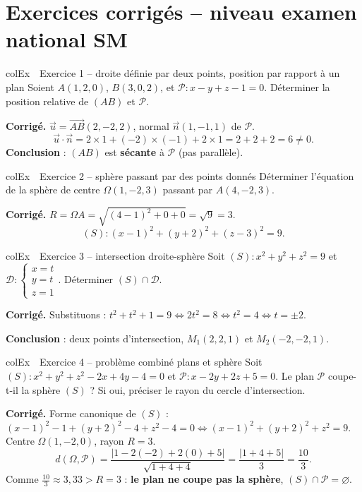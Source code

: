 \documentclass[11pt,a4paper]{article}
\newenvironment{exemple}[1][Exemple]
  {\begin{fiche}{colEx}{\ding{217}~~#1}}{\end{fiche}}
\begin{document}
\section{Exercices corrigés -- niveau examen national SM}

\begin{exemple}[Exercice 1 -- droite définie par deux points, position par rapport à un plan]
Soient $A(1,2,0)$, $B(3,0,2)$, et $\mathcal{P}:x-y+z-1=0$. Déterminer la position relative de $(AB)$ et $\mathcal{P}$.

\smallskip
\textbf{Corrigé.} $\vec u=\overrightarrow{AB}(2,-2,2)$, normal $\vec n(1,-1,1)$ de $\mathcal{P}$.
\[
  \vec u\cdot\vec n = 2\times1+(-2)\times(-1)+2\times1 = 2+2+2 = 6 \ne 0.
\]
\textbf{Conclusion} : $(AB)$ est \textbf{sécante} à $\mathcal{P}$ (pas parallèle).
\end{exemple}

\begin{exemple}[Exercice 2 -- sphère passant par des points donnés]
Déterminer l'équation de la sphère de centre $\Omega(1,-2,3)$ passant par $A(4,-2,3)$.

\smallskip
\textbf{Corrigé.} $R=\Omega A=\sqrt{(4-1)^2+0+0}=\sqrt9=3$.
\[
  (S):(x-1)^2+(y+2)^2+(z-3)^2=9.
\]
\end{exemple}

\begin{exemple}[Exercice 3 -- intersection droite-sphère]
Soit $(S):x^2+y^2+z^2=9$ et $\mathcal{D}:\begin{cases}x=t\\y=t\\z=1\end{cases}$. Déterminer $(S)\cap\mathcal{D}$.

\smallskip
\textbf{Corrigé.} Substituons : $t^2+t^2+1=9\iff2t^2=8\iff t^2=4\iff t=\pm2$.

\smallskip
\textbf{Conclusion} : deux points d'intersection, $M_1(2,2,1)$ et $M_2(-2,-2,1)$.
\end{exemple}

\begin{exemple}[Exercice 4 -- problème combiné plans et sphère]
Soit $(S):x^2+y^2+z^2-2x+4y-4=0$ et $\mathcal{P}:x-2y+2z+5=0$. Le plan $\mathcal{P}$ coupe-t-il la sphère $(S)$ ? Si oui, préciser le rayon du cercle d'intersection.

\smallskip
\textbf{Corrigé.} Forme canonique de $(S)$ : $(x-1)^2-1+(y+2)^2-4+z^2-4=0\iff(x-1)^2+(y+2)^2+z^2=9$. Centre $\Omega(1,-2,0)$, rayon $R=3$.
\[
  d(\Omega,\mathcal{P}) = \frac{|1-2(-2)+2(0)+5|}{\sqrt{1+4+4}} = \frac{|1+4+5|}{3} = \frac{10}{3}.
\]
Comme $\frac{10}3\approx3{,}33>R=3$ : \textbf{le plan ne coupe pas la sphère}, $(S)\cap\mathcal{P}=\varnothing$.
\end{exemple}
\end{document}
